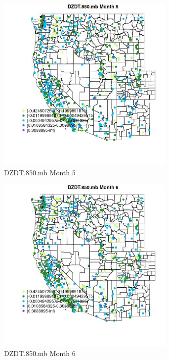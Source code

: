 \begin{figure} 
\centering  
\includegraphics[width=0.77\textwidth]{Code_Outputs/Report_ML_input_PM25_Step4_part_e_de_duplicated_aves_compiled_2019-05-14wNAs_MapObsMo5DZDT850mb.jpg} 
\caption{\label{fig:Report_ML_input_PM25_Step4_part_e_de_duplicated_aves_compiled_2019-05-14wNAsMapObsMo5DZDT850mb}DZDT.850.mb Month 5} 
\end{figure} 
 

\clearpage 

\begin{figure} 
\centering  
\includegraphics[width=0.77\textwidth]{Code_Outputs/Report_ML_input_PM25_Step4_part_e_de_duplicated_aves_compiled_2019-05-14wNAs_MapObsMo6DZDT850mb.jpg} 
\caption{\label{fig:Report_ML_input_PM25_Step4_part_e_de_duplicated_aves_compiled_2019-05-14wNAsMapObsMo6DZDT850mb}DZDT.850.mb Month 6} 
\end{figure} 
 

